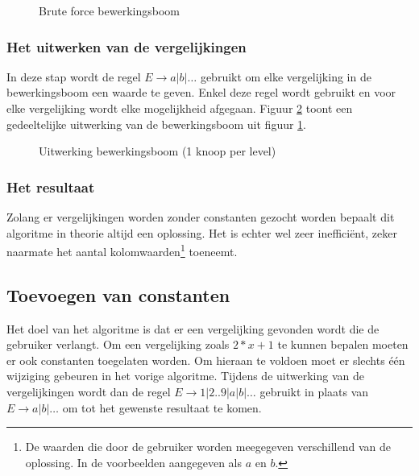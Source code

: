 \documentclass[Main.tex]{subfiles}
\begin{document}
\begin{figure}[!htb]
\centering
{}
\caption{Brute force bewerkingsboom} \label{fig:bewerkingsboom}
\end{figure}
\subsubsection*{Het uitwerken van de vergelijkingen}
In deze stap wordt de regel $E \rightarrow a | b | \dotsc$ gebruikt om elke vergelijking in de bewerkingsboom een waarde te geven. Enkel deze regel wordt gebruikt en voor elke vergelijking wordt elke mogelijkheid afgegaan. Figuur \ref{fig:uitwerkingsboom} toont een gedeeltelijke uitwerking van de bewerkingsboom uit figuur \ref{fig:bewerkingsboom}.
\begin{figure}[!htb]
\centering
{}
\caption{Uitwerking bewerkingsboom (1 knoop per level)} \label{fig:uitwerkingsboom}
\end{figure}
\subsubsection*{Het resultaat}
Zolang er vergelijkingen worden zonder constanten gezocht worden bepaalt dit algoritme in theorie altijd een oplossing. Het is echter wel zeer ineffici\"ent, zeker naarmate het aantal kolomwaarden\footnote{\label{note:kolomwaarden} De waarden die door de gebruiker worden meegegeven verschillend van de oplossing. In de voorbeelden aangegeven als $a$ en $b$.} toeneemt.

\subsection{Toevoegen van constanten}
Het doel van het algoritme is dat er een vergelijking gevonden wordt die de gebruiker verlangt. Om een vergelijking zoals $2 \ast x+1$ te kunnen bepalen moeten er ook constanten toegelaten worden. Om hieraan te voldoen moet er slechts \'e\'en wijziging gebeuren in het vorige algoritme. Tijdens de uitwerking van de vergelijkingen wordt dan de regel $E \rightarrow 1 | 2 .. 9 | a | b | \dotsc$ gebruikt in plaats van $E \rightarrow a | b | \dotsc$ om tot het gewenste resultaat te komen.
\end{document}
